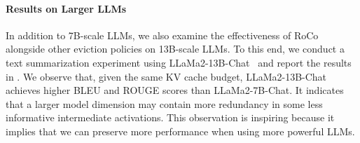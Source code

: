 \paragraph{Results on Larger LLMs} In addition to 7B-scale LLMs, we also examine the effectiveness of RoCo alongside other eviction policies on 13B-scale LLMs. To this end, we conduct a text summarization experiment using LLaMa2-13B-Chat~\cite{llama2} and report the results in . We observe that, given the same KV cache budget, LLaMa2-13B-Chat achieves higher BLEU and ROUGE scores than LLaMa2-7B-Chat. It indicates that a larger model dimension may contain more redundancy in some less informative intermediate activations. This observation is inspiring because it implies that we can preserve more performance when using more powerful LLMs.

